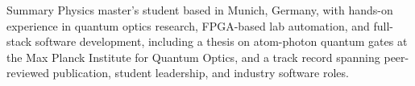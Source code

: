 \makeatletter
\begingroup
\prefix{\hspace*{-3ex}\hphantom{\@prefixmarker}\hspace*{0ex}}
\begin{rubric}{Summary}
	\entry*[]%
	Physics master's student based in Munich, Germany, with hands-on experience in quantum optics research, FPGA-based lab automation, and full-stack software development, including a thesis on atom-photon quantum gates at the Max Planck Institute for Quantum Optics, and a track record spanning peer-reviewed publication, student leadership, and industry software roles.
\end{rubric}
\endgroup
\prefix{%
	\hspace*{-1ex}
	\color{MarkerColour!80!black}\@prefixmarker%
	\hspace*{1ex}%
}
\makeatother






